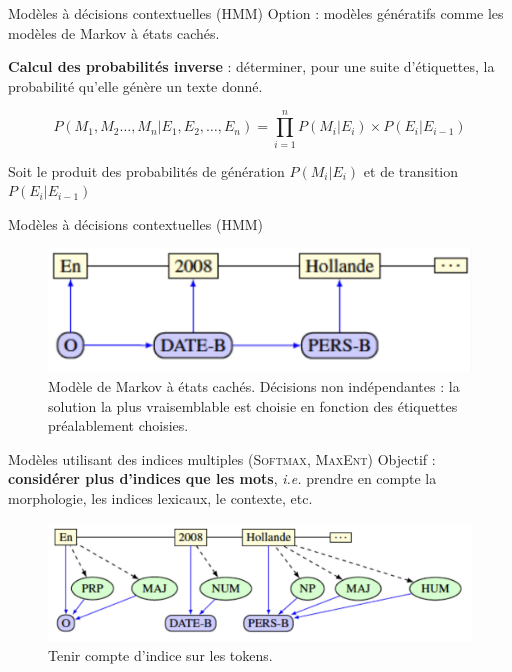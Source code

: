 \documentclass[xetex,xcolor={table,usenames,dvipsnames}]{beamer}
\newcommand{\bolder}[1]{{\color{purple}\bfseries#1}}
\begin{document}
\begin{frame}{Modèles à décisions contextuelles (\textsc{HMM})}
	Option : modèles génératifs comme les modèles de Markov à états cachés.
	
	\bolder{Calcul des probabilités inverse} : déterminer, pour une suite d'étiquettes, la probabilité qu'elle génère un texte donné.
	
	\begin{equation*}
		P(M_{1}, M_{2}\dots, M_{n}|E_{1}, E_{2},\dots, E_{n}) = \prod_{i=1}^{n}P(M_{i}|E_{i}) \times P(E_{i}|E_{i-1})
	\end{equation*}
	
	Soit le produit des probabilités de génération $P(M_{i}|E_{i})$ et de transition $P(E_{i}|E_{i-1})$
\end{frame}

\begin{frame}{Modèles à décisions contextuelles (\textsc{HMM})}
						\begin{figure}[h] %
		\centering
		\includegraphics[width=.9\linewidth]{img/hmm.png}
		\caption{Modèle de Markov à états cachés. Décisions non indépendantes : la solution la plus vraisemblable est choisie en fonction des étiquettes préalablement choisies.}
		\label{fig:ling_out_TAL}
	\end{figure}
\end{frame}

\begin{frame}{Modèles utilisant des indices multiples (\textsc{Softmax}, \textsc{MaxEnt})}
	Objectif : \textcolor{deepblue}{\textbf{considérer plus d'indices que les mots}}, \textit{i.e.} prendre en compte la morphologie, les indices lexicaux, le contexte, etc.
							\begin{figure}[h] %
		\centering
		\includegraphics[width=.9\linewidth]{img/indices_multiples.png}
		\caption{Tenir compte d'indice sur les tokens.}
		\label{fig:ling_out_TAL}
	\end{figure}
\end{frame}
\end{document}
